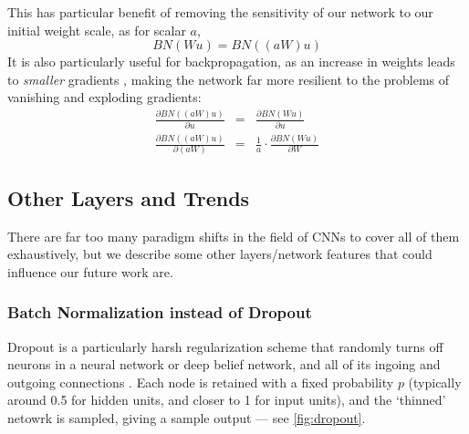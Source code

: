       This has particular benefit of removing the sensitivity of our network to
      our initial weight scale, as for scalar $a$,
      \begin{equation}
        BN(Wu) = BN((aW)u)
      \end{equation}
      It is also particularly useful for backpropagation, as an increase in
      weights leads to \emph{smaller} gradients \citep{ioffe_batch_2015}, making
      the network far more resilient to the problems of vanishing and exploding
      gradients:
      \begin{eqnarray}
        \frac{\partial BN((aW)u)}{\partial u} & = & \frac{\partial
        BN(Wu)}{\partial u} \nonumber\\
        \frac{\partial BN((aW)u)}{\partial (aW)} & = & \frac{1}{a} \cdot \frac{\partial
        BN(Wu)}{\partial W} 
      \end{eqnarray}

% 
% 
% 
\subsection{Other Layers and Trends}\label{sec:cnn_other_trends}
  There are far too many paradigm
  shifts in the field of CNNs to cover all of them exhaustively, but we
  describe some other layers/network features that could influence our future
  work are.

\subsubsection{Batch Normalization instead of Dropout}
  Dropout is a particularly harsh regularization scheme that randomly turns off
  neurons in a neural network or deep belief network, and all
  of its ingoing and outgoing connections
  \citep{srivastava_dropout:_2014,hinton_improving_2012}. Each node is retained with a fixed
  probability $p$ (typically around 0.5 for hidden units, and closer to 1 for
  input units), and the `thinned' netowrk is sampled, giving a sample output
  --- see \autoref{fig:dropout}.


